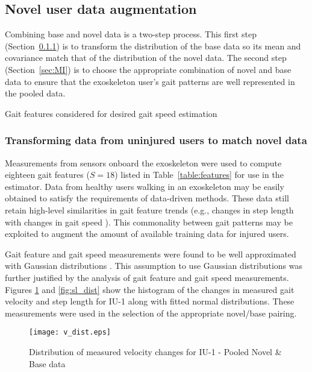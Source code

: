 \subsection{Novel user data augmentation}

Combining base and novel data is a two-step process. This first step (Section~\ref{sec:mp_transform}) is to transform the distribution of the base data so its mean and covariance match that of the distribution of the novel data. The second step (Section~\ref{sec:MI}) is to choose the appropriate combination of novel and base data to ensure that the exoskeleton user's gait patterns are well represented in the pooled data.

\begin{table}
	\footnotesize
	\centering
	\caption{Gait features considered for desired gait speed estimation }\label{table:features}
	
\end{table}

\subsubsection{Transforming data from uninjured users to match novel data} \label{sec:mp_transform}
Measurements from sensors onboard the exoskeleton were used to compute eighteen gait features ($S=18$) listed in Table~\ref{table:features} for use in the estimator. Data from healthy users walking in an exoskeleton may be easily obtained to satisfy the requirements of data-driven methods. These data still retain high-level similarities in gait feature trends (e.g., changes in step length with changes in gait speed \cite{karulkar2021using}). This commonality between gait patterns may be exploited to augment the amount of available training data for injured users.

Gait feature and gait speed measurements were found to be well approximated with Gaussian distributions \cite{austin2011disambiguation}. This assumption to use Gaussian distributions was further justified by the analysis of gait feature and gait speed measurements. Figures \ref{fig:v_dist} and \ref{fig:sl_dist} show the histogram of the changes in measured gait velocity and step length for IU-1 along with fitted normal distributions. These measurements were used in the selection of the appropriate novel/base pairing. 

\begin{figure}
	\centering
	\texttt{[image: v\_dist.eps]}
	\caption{Distribution of measured velocity changes for IU-1 - Pooled Novel \& Base data}\label{fig:v_dist}
\end{figure}

